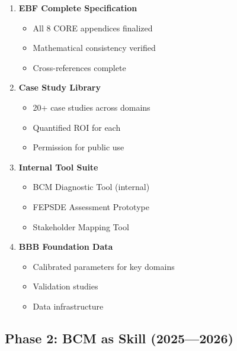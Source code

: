 \begin{enumerate}
\item \textbf{EBF Complete Specification}
   \begin{itemize}
   \item All 8 CORE appendices finalized
   \item Mathematical consistency verified
   \item Cross-references complete
   \end{itemize}

\item \textbf{Case Study Library}
   \begin{itemize}
   \item 20+ case studies across domains
   \item Quantified ROI for each
   \item Permission for public use
   \end{itemize}

\item \textbf{Internal Tool Suite}
   \begin{itemize}
   \item BCM Diagnostic Tool (internal)
   \item FEPSDE Assessment Prototype
   \item Stakeholder Mapping Tool
   \end{itemize}

\item \textbf{BBB Foundation Data}
   \begin{itemize}
   \item Calibrated parameters for key domains
   \item Validation studies
   \item Data infrastructure
   \end{itemize}
\end{enumerate}


\subsection{Phase 2: BCM as Skill (2025---2026)}

